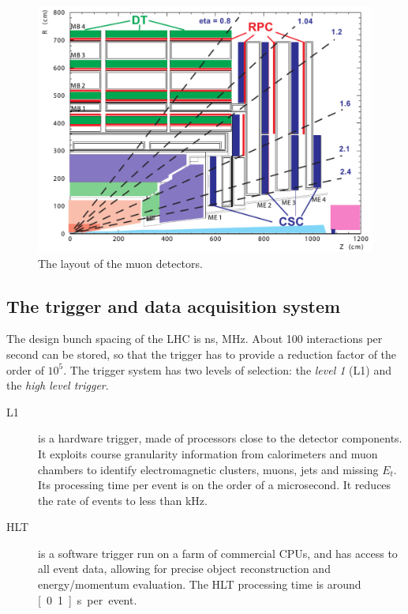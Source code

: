\begin{figure}[htb]
    \centering
    \includegraphics[width=\textwidth]{images/pdf/cms_muon_system}

    \caption{The layout of the muon detectors.}
    \label{fig:cms_muon_system}
\end{figure}

\subsection{The trigger and data acquisition system}
The design bunch spacing of the LHC is \unit[25]{ns}, \ie
\unit[40]{MHz}. About 100 interactions per second can be stored, so that
the trigger has to provide a reduction factor of the order of $10^{5}$.
The trigger system has two levels of selection: the \emph{level 1} (L1) and
the \emph{high level trigger}.
\begin{description}
    \item[L1] is a hardware trigger, made of processors close to the
        detector components. It exploits course granularity information from
        calorimeters and muon chambers to identify electromagnetic clusters,
        muons, jets and missing $E_t$. Its processing time per event is on
        the order of a microsecond. It reduces the rate of events to less
        than \unit[100]{kHz}.
    \item[HLT] is a software trigger run on a farm of commercial CPUs,
        and has access to all event data, allowing for precise object
        reconstruction and energy/momentum evaluation. The HLT processing
        time is around \unit[0.1]{s} per event.
\end{description}
